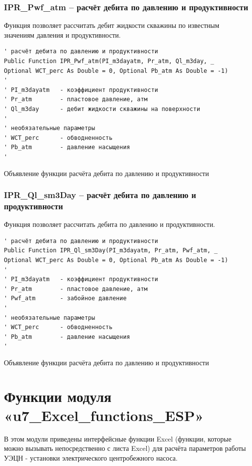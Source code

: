 \documentclass[]{scrreprt}
\begin{document}
\subsection{IPR\_Pwf\_atm – расчёт дебита по давлению и продуктивности}
Функция позволяет рассчитать дебит жидкости скважины по известным значениям давления и продуктивности.

\begin{listing}[H]
	\begin{verbatim}
' расчёт дебита по давлению и продуктивности
Public Function IPR_Pwf_atm(PI_m3dayatm, Pr_atm, Ql_m3day, _
Optional WCT_perc As Double = 0, Optional Pb_atm As Double = -1)
'
' PI_m3dayatm   - коэффициент продуктивности
' Pr_atm        - пластовое давление, атм
' Ql_m3day      - дебит жидкости скважины на поверхности
'
' необязательные параметры
' WCT_perc      - обводненность
' Pb_atm        - давление насыщения
'
	\end{verbatim}
	\caption{Объявление функции расчёта дебита по давлению и продуктивности}
	\label{lst:codedIPR_Pwf}
\end{listing}
\newpage
\subsection{IPR\_Ql\_sm3Day – расчёт дебита по давлению и продуктивности}
Функция позволяет рассчитать дебита по давлению и продуктивности.
\begin{listing}[H]
	\begin{verbatim}
' расчёт дебита по давлению и продуктивности
Public Function IPR_Ql_sm3Day(PI_m3dayatm, Pr_atm, Pwf_atm, _
Optional WCT_perc As Double = 0, Optional Pb_atm As Double = -1)
'
' PI_m3dayatm   - коэффициент продуктивности
' Pr_atm        - пластовое давление, атм
' Pwf_atm       - забойное давление
'
' необязательные параметры
' WCT_perc      - обводненность
' Pb_atm        - давление насыщения
'

	\end{verbatim}
	\caption{Объявление функции расчёта дебита по давлению и продуктивности}
	\label{lst:codedIPR_Ql}
\end{listing}


\newpage
\chapter{Функции модуля  «u7\_Excel\_functions\_ESP»}
В этом модули приведены интерфейсные функции Excel (функции, которые можно вызывать непосредственно с листа Excel) для расчёта параметров работы УЭЦН - установки электрического центробежного насоса. 
\end{document}
